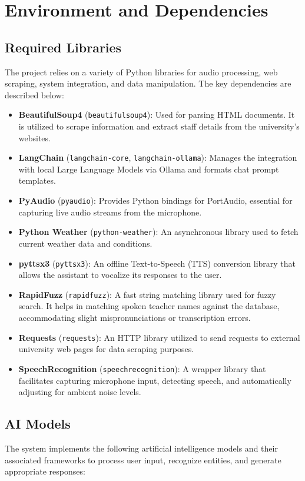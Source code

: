 \documentclass{article}
\begin{document}
	\section{Environment and Dependencies}
	
	\subsection{Required Libraries}
	The project relies on a variety of Python libraries for audio processing, web scraping, system integration, and data manipulation. The key dependencies are described below:
	
	\begin{itemize}
		\item \textbf{BeautifulSoup4} (\texttt{beautifulsoup4}): Used for parsing HTML documents. It is utilized to scrape information and extract staff details from the university's websites.
		\item \textbf{LangChain} (\texttt{langchain-core}, \texttt{langchain-ollama}): Manages the integration with local Large Language Models via Ollama and formats chat prompt templates.
		\item \textbf{PyAudio} (\texttt{pyaudio}): Provides Python bindings for PortAudio, essential for capturing live audio streams from the microphone.
		\item \textbf{Python Weather} (\texttt{python-weather}): An asynchronous library used to fetch current weather data and conditions.
		\item \textbf{pyttsx3} (\texttt{pyttsx3}): An offline Text-to-Speech (TTS) conversion library that allows the assistant to vocalize its responses to the user.
		\item \textbf{RapidFuzz} (\texttt{rapidfuzz}): A fast string matching library used for fuzzy search. It helps in matching spoken teacher names against the database, accommodating slight mispronunciations or transcription errors.
		\item \textbf{Requests} (\texttt{requests}): An HTTP library utilized to send requests to external university web pages for data scraping purposes.
		\item \textbf{SpeechRecognition} (\texttt{speechrecognition}): A wrapper library that facilitates capturing microphone input, detecting speech, and automatically adjusting for ambient noise levels.
	\end{itemize}
	
	\subsection{AI Models}
	The system implements the following artificial intelligence models and their associated frameworks to process user input, recognize entities, and generate appropriate responses:
	
\end{document}

